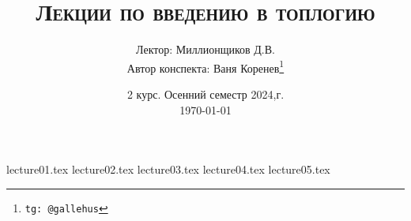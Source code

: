 \documentclass[a4paper]{article}
\title{\scshape {Лекции по введению в топлогию}}
\date{2 курс. Осенний семестр 2024,г. \\ \today}
\author{Лектор: Миллионщиков Д.В. \\ Автор конспекта: Ваня Коренев\thanks{\texttt{tg: @gallehus}}}
\begin{document}
\maketitle
\newpage
\tableofcontents

\newpage

{lecture01.tex}
{lecture02.tex}
{lecture03.tex}
{lecture04.tex}
{lecture05.tex}
\end{document}
